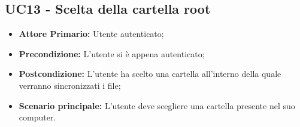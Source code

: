 \subsection{UC13 - Scelta della cartella root}
\label{UC13}
\begin{itemize}
\item \textbf{Attore Primario:} Utente autenticato;
\item \textbf{Precondizione:} L'utente si è appena autenticato;
\item \textbf{Postcondizione:} L'utente ha scelto una cartella all'interno della quale verranno sincronizzati i file;
\item \textbf{Scenario principale:} L'utente deve scegliere una cartella presente nel suo computer.
\end{itemize}